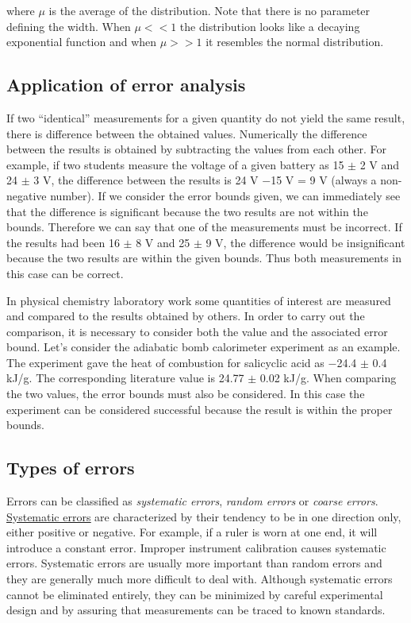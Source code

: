\documentclass[byrevtex,amssymb,aps,pra,floatfix,letterpaper]{revtex4}
\begin{document}
\noindent
where $\mu$ is the average of the distribution. Note that there is no parameter defining the width. When $\mu<<1$ the distribution looks like a decaying exponential function and when $\mu>>1$ it resembles the normal distribution.

\subsection{Application of error analysis}

If two ``identical'' measurements for a given quantity do not yield the same result, there is difference between the obtained values. Numerically the difference between the results is obtained by subtracting the values from each other. For example, if two students measure the voltage of a given battery as 15 $\pm$ 2 V and 24 $\pm$ 3 V, the difference between the results is 24 V $-$15 V = 9 V (always a non-negative number). If we consider the error bounds given, we can
immediately see that the difference is significant because the two results are not within the bounds. Therefore we can say that one of the measurements must be incorrect. If the results had been 16 $\pm$ 8 V and 25 $\pm$ 9 V, the difference would be insignificant because the two results are within the given bounds. Thus both measurements in this case can be correct.

In physical chemistry laboratory work some quantities of interest are measured and compared to the results obtained by others. In order to carry out the comparison, it is necessary to consider both the value and the associated error bound. Let's consider the adiabatic bomb
calorimeter experiment as an example. The experiment gave the heat of combustion for salicyclic acid as $-$24.4 $\pm$ 0.4 kJ/g. The corresponding literature value is 24.77 $\pm$ 0.02 kJ/g. When comparing the two values, the error bounds must also be considered. In this case the experiment can be considered successful because the result is within the proper bounds.

\subsection{Types of errors}

Errors can be classified as \textit{systematic errors}, \textit{random errors} or \textit{coarse errors}. \href{http://en.wikipedia.org/wiki/Systematic_error}{\underline{Systematic errors}} are characterized by their tendency to be in one direction only, either positive or negative. For example, if a ruler is worn at one end, it will introduce a constant error. Improper instrument calibration causes systematic errors. Systematic errors are usually more important than random errors and they are generally much more difficult to deal with. Although systematic errors cannot be eliminated entirely, they can be minimized by careful experimental design and by assuring that measurements can be traced to known standards.
\end{document}
